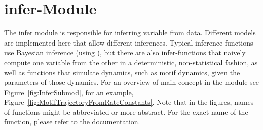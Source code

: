 \chapter{infer-Module}

The infer module is responsible for inferring variable from data.
Different models are implemented here that allow different inferences.
Typical inference functions use Bayesian inference (using ),
but there are also infer-functions that naively compute one variable from the
other in a deterministic, non-statistical fashion,
as well as functions that simulate dynamics,
such as motif dynamics,
given the parameters of those dynamics.
For an overview of main concept in the  module see
Figure~\ref{fig:InferSubmod},
for an example, Figure~\ref{fig:MotifTrajectoryFromRateConstants}.
Note that in the figures, names of functions might be abbreviated or more
abstract.
For the exact name of the function, please refer to the documentation.
